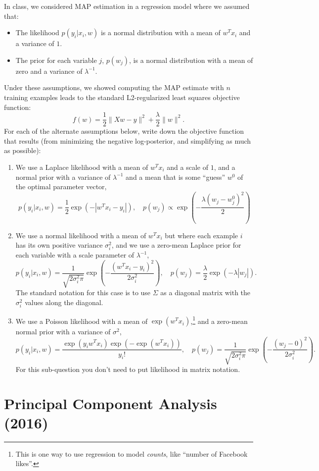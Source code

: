 \documentclass{article}
\def\blu#1{{\color{blu}#1}}
\def\norm#1{\|#1\|}
\def\items#1{\begin{itemize}#1\end{itemize}}
\def\enum#1{\begin{enumerate}#1\end{enumerate}}
\begin{document}
In class, we considered MAP estimation in a regression model where we assumed that:
\items{
\item The likelihood $p(y_i | x_i, w)$ is a normal distribution with a mean of $w^Tx_i$ and a variance of $1$.
\item The prior for each variable $j$, $p(w_j)$, is a normal distribution with a mean of zero and a variance of $\lambda^{-1}$.
}
Under these assumptions, we showed computing the MAP estimate with $n$ training examples leads to the standard L2-regularized least squares objective function:
\[
f(w) = \frac{1}{2}\norm{Xw - y}^2 + \frac \lambda 2 \norm{w}^2.
\]
\blu{For each of the alternate assumptions below, write down the objective function that results} (from minimizing the negative log-posterior, and simplifying as much as possible):
\enum{
\item We use a Laplace likelihood with a mean of $w^Tx_i$ and a scale of $1$, and a normal prior with a variance of $\lambda^{-1}$ and a mean that is some ``guess'' $w^0$ of the optimal parameter vector,
\[
p(y_i | x_i, w) = \frac 1 2 \exp(-|w^Tx_i - y_i|), \quad p(w_j) \propto \exp\left(-\frac{\lambda(w_j -  w^0_j)^2}{2}\right)
\]
\item We use a normal  likelihood with a mean of $w^Tx_i$ but where each example $i$ has its own  positive variance $\sigma_i^2$, and we use a zero-mean Laplace prior for each variable with a scale parameter of $\lambda^{-1}$,
\[
p(y_i | x_i,w) = \frac{1}{\sqrt{2\sigma_i^2\pi}}\exp\left(-\frac{(w^Tx_i - y_i)^2}{2\sigma_i^2}\right), \quad p(w_j) = \frac{\lambda}{2}\exp(-\lambda|w_j|).
\]
The standard notation for this case is to use $\Sigma$ as a diagonal matrix with the $\sigma_i^2$ values along the diagonal.
\item We use a Poisson likelihood with a mean of $\exp(w^Tx_i)$,\footnote{This is one way to use regression to model \emph{counts}, like ``number of Facebook likes''.} and a zero-mean normal prior with a variance of $\sigma^2$,
\[
p(y_i | x_i, w) = \frac{\exp(y_iw^Tx_i)\exp(-\exp(w^Tx_i))}{y_i!}, \quad p(w_j) = \frac{1}{\sqrt{2\sigma_i^2\pi}}\exp\left(-\frac{(w_j - 0)^2}{2\sigma_i^2}\right).
\]
For this sub-question you don't need to put likelihood in matrix notation.
}





\section{Principal Component Analysis (2016)}
\end{document}
